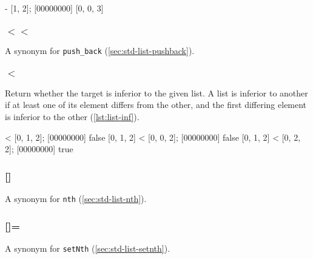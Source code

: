 \begin{urbiscript}[caption=List.'', label=lst:list-minus,
  float=\floatpos]
[0, 1, 0, 2, 3] - [1, 2];
[00000000] [0, 0, 3]
\end{urbiscript}

\subsubsection{$<<$}

A synonym for \lstinline|push_back| (\autoref{sec:std-list-pushback}).

\subsubsection{$<$}

Return whether the target is inferior to the given list. A list is
inferior to another if at least one of its element differs from the
other, and the first differing element is inferior to the other
(\autoref{lst:list-inf}).

\begin{urbiscript}[caption=List.'', label=lst:list-inf,
  float=\floatpos]
[0, 1, 2] < [0, 1, 2];
[00000000] false
[0, 1, 2] < [0, 0, 2];
[00000000] false
[0, 1, 2] < [0, 2, 2];
[00000000] true
\end{urbiscript}

\subsubsection{[]}
A synonym for \lstinline|nth| (\autoref{sec:std-list-nth}).

\subsubsection{[]=}
A synonym for \lstinline|setNth| (\autoref{sec:std-list-setnth}).
